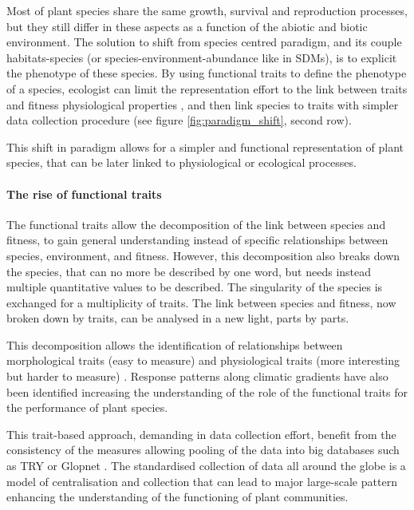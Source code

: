 Most of plant species share the same growth, survival and reproduction processes, but they still differ in these aspects as a function of the abiotic and biotic environment. The solution to shift from species centred paradigm, and its couple habitats-species (or species-environment-abundance like in SDMs), is to explicit the phenotype of these species. By using functional traits to define the phenotype of a species, ecologist can limit the representation effort to the link between traits and fitness physiological properties \parencite{reich_leaf_1992}, and then link species to traits with simpler data collection procedure \parencite{cornelissen_handbook_2003} (see figure \ref{fig:paradigm_shift}, second row).


This shift in paradigm allows for a simpler and functional representation of plant species, that can be later linked to physiological or ecological processes.




\paragraph{The rise of functional traits}

The functional traits allow the decomposition of the link between species and fitness, to gain general understanding instead of specific relationships between species, environment, and fitness. However, this decomposition also breaks down the species, that can no more be described by one word, but needs instead multiple quantitative values to be described. The singularity of the species is exchanged for a multiplicity of traits. The link between species and fitness, now broken down by traits, can be analysed in a new light, parts by parts.

This decomposition allows the identification of relationships between morphological traits (easy to measure) and physiological traits (more interesting but harder to measure) \parencite{ackerly_convergence_1999, poorter_leaf_2006,  reich_world-wide_2014}. Response patterns along climatic gradients have also been identified \parencite{niinemets_global-scale_2001} increasing the understanding of the role of the functional traits for the performance of plant species.

This trait-based approach, demanding in data collection effort, benefit from the consistency of the measures \parencite{cornelissen_handbook_2003} allowing pooling of the data into big databases such as TRY \parencite{kattge_try_2011} or Glopnet \parencite{wright_worldwide_2004}. The standardised collection of data all around the globe is a model of centralisation and collection that can lead to major large-scale pattern enhancing the understanding of the functioning of plant communities.

